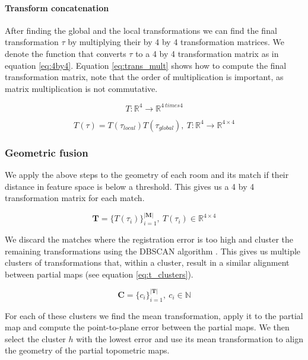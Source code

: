 \paragraph{Transform concatenation}
After finding the global and the local transformations we can find the final transformation \(\tau\) by multiplying their by 4 by 4 transformation matrices. We denote the function that converts \(\tau\) to a 4 by 4 transformation matrix as in equation \ref{eq:4by4}. Equation \ref{eq:trans_mult} shows how to compute the final transformation matrix, note that the order of multiplication is important, as matrix multiplication is not commutative.

\begin{equation}
    \label{eq:4by4}
    T: \mathbb{R}^4 \rightarrow \mathbb{R}^{4 \ times 4}
\end{equation}

\begin{equation}
    \label{eq:trans_mult}
    T(\tau) = T(\tau_{local})T(\tau_{global}),\ T: \mathbb{R}^4 \rightarrow \mathbb{R}^{4 \times 4}
\end{equation}

\subsubsection{Geometric fusion}
We apply the above steps to the geometry of each room and its match if their distance in feature space is below a threshold. This gives us a 4 by 4 transformation matrix for each match.

\begin{equation}
    \label{eq:room_t}
    \mathbf{T} = \{T(\tau_i)\}_{i=1}^{|\mathbf{M}|},\ T(\tau_i) \in \mathbb{R}^{4 \times 4}
\end{equation}

We discard the matches where the registration error is too high and cluster the remaining transformations using the DBSCAN algorithm \citep{schubert_dbscan_2017}. This gives us multiple clusters of transformations that, within a cluster, result in a similar alignment between partial maps (see equation \ref{eq:t_clusters}). 

\begin{equation}
    \label{eq:t_clusters}
    \mathbf{C} = \{c_i\}_{i=1}^{|\mathbf{T}|},\ c_i \in \mathbb{N}
\end{equation}


For each of these clusters we find the mean transformation, apply it to the partial map and compute the point-to-plane error between the partial maps. We then select the cluster \(h\) with the lowest error and use its mean transformation to align the geometry of the partial topometric maps. 

